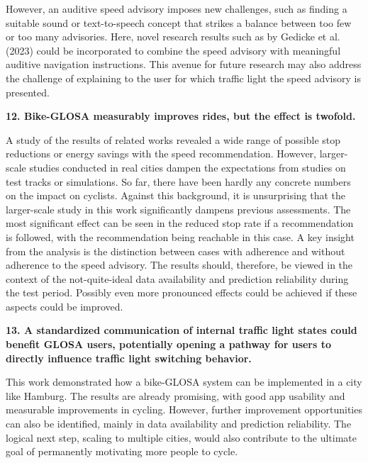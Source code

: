However, an auditive speed advisory imposes new challenges, such as finding a suitable sound or text-to-speech concept that strikes a balance between too few or too many advisories. Here, novel research results such as by Gedicke et al. (2023) \cite{gedicke_selecting_2023} could be incorporated to combine the speed advisory with meaningful auditive navigation instructions. This avenue for future research may also address the challenge of explaining to the user for which traffic light the speed advisory is presented.

\textbf{\color{cidarkblue}12. Bike-GLOSA measurably improves rides, but the effect is twofold.} 

A study of the results of related works revealed a wide range of possible stop reductions or energy savings with the speed recommendation. However, larger-scale studies conducted in real cities dampen the expectations from studies on test tracks or simulations. So far, there have been hardly any concrete numbers on the impact on cyclists. Against this background, it is unsurprising that the larger-scale study in this work significantly dampens previous assessments. The most significant effect can be seen in the reduced stop rate if a recommendation is followed, with the recommendation being reachable in this case. A key insight from the analysis is the distinction between cases with adherence and without adherence to the speed advisory. The results should, therefore, be viewed in the context of the not-quite-ideal data availability and prediction reliability during the test period. Possibly even more pronounced effects could be achieved if these aspects could be improved.

\textbf{\color{cidarkblue}13. A standardized communication of internal traffic light states could benefit GLOSA users, potentially opening a pathway for users to directly influence traffic light switching behavior.}

This work demonstrated how a bike-GLOSA system can be implemented in a city like Hamburg. The results are already promising, with good app usability and measurable improvements in cycling. However, further improvement opportunities can also be identified, mainly in data availability and prediction reliability. The logical next step, scaling to multiple cities, would also contribute to the ultimate goal of permanently motivating more people to cycle.